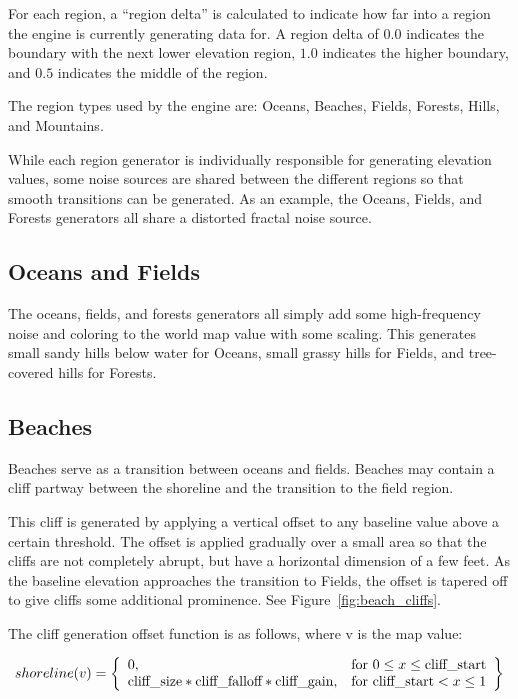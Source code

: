 For each region, a ``region delta'' is calculated to indicate how far into a region the engine is currently generating data for.
A region delta of \(0.0\) indicates the boundary with the next lower elevation region, \(1.0\) indicates the higher boundary, and \(0.5\) indicates the middle of the region.

The region types used by the engine are: Oceans, Beaches, Fields, Forests, Hills, and Mountains.

While each region generator is individually responsible for generating elevation values, some noise sources are shared between the different regions so that smooth transitions can be generated.
As an example, the Oceans, Fields, and Forests generators all share a distorted fractal noise source.

\subsection{Oceans and Fields}

The oceans, fields, and forests generators all simply add some high-frequency noise and coloring to the world map value with some scaling.
This generates small sandy hills below water for Oceans, small grassy hills for Fields, and tree-covered hills for Forests.

\subsection{Beaches}

Beaches serve as a transition between oceans and fields.
Beaches may contain a cliff partway between the shoreline and the transition to the field region.

This cliff is generated by applying a vertical offset to any baseline value above a certain threshold.
The offset is applied gradually over a small area so that the cliffs are not completely abrupt, but have a horizontal dimension of a few feet.
As the baseline elevation approaches the transition to Fields, the offset is tapered off to give cliffs some additional prominence.
See Figure~\ref{fig:beach_cliffs}.

The cliff generation offset function is as follows, where v is the map value:

$$
shoreline(v) = \left\{\begin{array}{lr}
	0, & \text{for } 0 \leq x \leq \text{cliff\_start} \\
	\text{cliff\textunderscore size} * \text{cliff\_falloff} * \text{cliff\_gain}, & \text{for } \text{cliff\_start} < x \leq 1
\end{array}\right\}
$$


